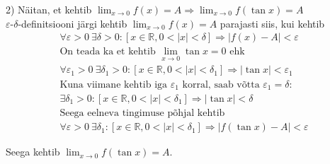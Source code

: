 \documentclass{article}
\begin{document}
2) N\"aitan, et kehtib $\displaystyle\lim_{x\to0} f(x)=A\Rightarrow\displaystyle\lim_{x\to0}f(\tan x)=A$\\ $\varepsilon$-$\delta$-definitsiooni j\"argi kehtib $\displaystyle\lim_{x\to0} f(x)=A$ parajasti siis, kui kehtib
\begin{gather*}
\forall \varepsilon>0\ \exists \delta>0:[x\in \mathbb{R}, 0<|x|<\delta]\Rightarrow |f(x)-A|<\varepsilon\\
\text{On teada ka et kehtib }\lim_{x\to0} \tan x=0\text{ ehk}\\
\forall \varepsilon_1>0\ \exists \delta_1>0:[x\in \mathbb{R}, 0<|x|<\delta_1]\Rightarrow |\tan x|<\varepsilon_1\\
\text{Kuna viimane kehtib iga }\varepsilon_1\text{ korral, saab v\~otta } \varepsilon_1 = \delta:\\
\exists \delta_1>0:[x\in \mathbb{R}, 0<|x|<\delta_1]\Rightarrow |\tan x|<\delta\\
\text{Seega eelneva tingimuse p\~ohjal kehtib}\\
\forall \varepsilon>0\ \exists \delta_1:[x\in \mathbb{R}, 0<|x|<\delta_1]\Rightarrow |f(\tan x)-A|<\varepsilon
\end{gather*}
\begin{center}
Seega kehtib $\displaystyle\lim_{x\to0}f(\tan x)=A$.
\end{center}
\end{document}
